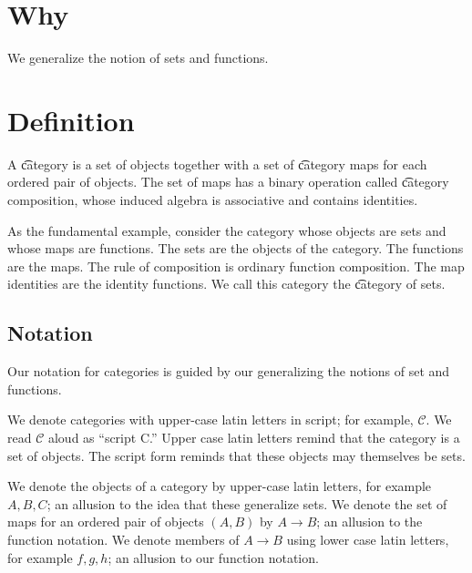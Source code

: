 
\section*{Why}

We generalize the notion of sets and functions.

\section*{Definition}

A \t{category} is a set of
objects together with a set of
\t{category maps} for each
ordered pair of objects.
The set of maps has a binary operation called
\t{category composition},
whose induced algebra is associative and contains identities.

As the fundamental example, consider the category whose
objects are sets and whose maps are functions.
The sets are the objects of the category.
The functions are the maps.
The rule of composition is ordinary function composition.
The map identities are the identity functions.
We call this category the \t{category of sets}.

\subsection*{Notation}

Our notation for categories is guided by our generalizing the notions of set and functions.

We denote categories with upper-case latin letters
in script; for example, $\mathcal{C} $.
We read $\mathcal{C} $ aloud as ``script C.''
Upper case latin letters remind that the category is a set of objects.
The script form reminds that these objects may themselves be sets.

We denote the objects of a category by upper-case latin letters,
for example $A, B, C$; an allusion to the idea that these generalize sets.
We denote the set of maps for an ordered pair of objects $(A, B)$
by $A \to B$; an allusion to the function notation.
We denote members of $A \to B$ using lower case latin letters,
for example $f, g, h$; an allusion to our function notation.
